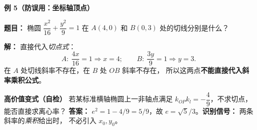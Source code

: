 \begin{examplebox}
\medskip
\textbf{\textcolor{CExample}{例 5（防误用：坐标轴顶点）}}

\textbf{题目：} 椭圆 $\dfrac{x^2}{16}+\dfrac{y^2}{9}=1$ 在
$A(4,0)$ 和 $B(0,3)$ 处的切线分别是什么？

\textbf{解：} 直接代入\emph{切点式}：
\[
 A:\ \frac{4x}{16}=1\Longrightarrow\boxed{x=4};\qquad
 B:\ \frac{3y}{9}=1\Longrightarrow\boxed{y=3}.
\]
在 $A$ 处切线斜率不存在，在 $B$ 处 $OB$ 斜率不存在，
所以这两点\textbf{不能直接代入斜率乘积公式}。

\medskip
\textbf{\textcolor{CExample}{高价值变式（自检）}}
若某标准横轴椭圆上一非轴点满足
$k_{OP}k_l=-\dfrac49$，不求切点，能否直接求离心率？
\textbf{答案：} $e^2=1-4/9=5/9$，故
$\boxed{e=\sqrt5/3}$。\textbf{识别信号：} 两条斜率的\emph{乘积}给出时，
不必引入 $x_0,y_0$。
\end{examplebox}
